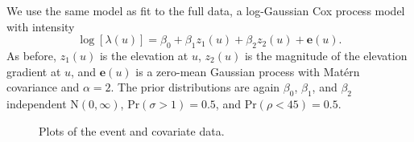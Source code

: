 \documentclass[]{interact}
\begin{document}
We use the same model as fit to the full data, a log-Gaussian Cox process model
with intensity
\begin{displaymath}
\log\left[\lambda(u)\right] = \beta_{0} + \beta_{1} z_{1}(u)
+ \beta_{2} z_{2}(u) + \mathbf{e}(u).
\end{displaymath}
As before, \(z_{1}(u)\) is the elevation at \(u\), \(z_{2}(u)\) is the
magnitude of the elevation gradient at \(u\), and \(\mathbf{e}(u)\) is a
zero-mean Gaussian process with Mat\'{e}rn covariance and \(\alpha = 2\).
The prior distributions are again \(\beta_{0}\), \(\beta_{1}\), and
\(\beta_{2}\) independent \(\mathrm{N}(0, \infty)\),
\(\mathrm{Pr}(\sigma > 1) = 0.5\), and \(\mathrm{Pr}(\rho < 45) = 0.5\).

\begin{figure}[p]




\caption{Plots of the event and covariate data.}
\label{effort}
\end{figure}
\end{document}
